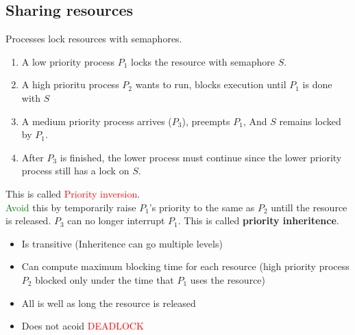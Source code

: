 \documentclass[course, english]{Notes}
\begin{document}
\subsection{Sharing resources}
Processes lock resources with semaphores.
\begin{enumerate}
	\item A low priority process $P_1$ locks the resource with semaphore
		$S$.
	\item A high prioritu process $P_2$ wants to run, blocks execution
		until $P_1$ is done with $S$
	\item A medium priority process arrives ($P_3$), preempts $P_1$, And
		$S$ remains locked by $P_1$.
	\item After $P_3$ is finished, the lower process must continue since the
		lower priority process still has a lock on $S$.
\end{enumerate}
This is called \textcolor{red}{Priority inversion}.\\
\textcolor{green}{Avoid} this by temporarily raise $P_1$'s priority to the same as $P_2$ untill the
resource is released. $P_3$ can no longer interrupt $P_1$. This is called
\textbf{priority inheritence}.

\begin{itemize}
	\item Is transitive (Inheritence can go multiple levels)
	\item Can compute maximum blocking time for each resource (high priority
		process $P_2$ blocked only under the time that $P_1$ uses the
		resource)
	\item All is well as long the resource is released
	\item Does not acoid \textcolor{red}{DEADLOCK}
\end{itemize}
\end{document}
